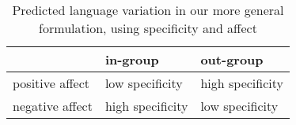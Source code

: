 \begin{table}[t]
    \centering
    \begin{tabular}{lll}
     \toprule
        \textbf{} & \textbf{in-group} & \textbf{out-group} \\ \midrule
        positive affect & low specificity &  high specificity \\ \midrule
        negative affect & high specificity & low specificity \\ 
    \bottomrule
    \end{tabular}
    \caption{Predicted language variation in our more general formulation, using specificity and affect}
    \label{tab:ib}
\end{table}
